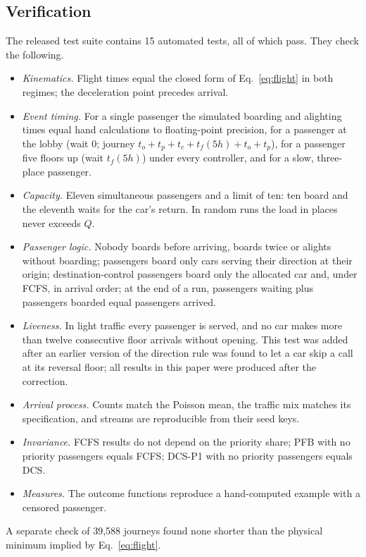 \documentclass[12pt,a4paper]{article}
\begin{document}
\subsection{Verification}
The released test suite contains 15 automated tests, all of which pass. They check the following.
\begin{itemize}[itemsep=1pt]
\item \emph{Kinematics.} Flight times equal the closed form of Eq.~\eqref{eq:flight} in both regimes; the deceleration point precedes arrival.
\item \emph{Event timing.} For a single passenger the simulated boarding and alighting times equal hand calculations to floating-point precision, for a passenger at the lobby (wait 0; journey $t_o+t_p+t_c+t_f(5h)+t_o+t_p$), for a passenger five floors up (wait $t_f(5h)$) under every controller, and for a slow, three-place passenger.
\item \emph{Capacity.} Eleven simultaneous passengers and a limit of ten: ten board and the eleventh waits for the car's return. In random runs the load in places never exceeds $Q$.
\item \emph{Passenger logic.} Nobody boards before arriving, boards twice or alights without boarding; passengers board only cars serving their direction at their origin; destination-control passengers board only the allocated car and, under FCFS, in arrival order; at the end of a run, passengers waiting plus passengers boarded equal passengers arrived.
\item \emph{Liveness.} In light traffic every passenger is served, and no car makes more than twelve consecutive floor arrivals without opening. This test was added after an earlier version of the direction rule was found to let a car skip a call at its reversal floor; all results in this paper were produced after the correction.
\item \emph{Arrival process.} Counts match the Poisson mean, the traffic mix matches its specification, and streams are reproducible from their seed keys.
\item \emph{Invariance.} FCFS results do not depend on the priority share; PFB with no priority passengers equals FCFS; DCS-P1 with no priority passengers equals DCS.
\item \emph{Measures.} The outcome functions reproduce a hand-computed example with a censored passenger.
\end{itemize}
A separate check of 39,588 journeys found none shorter than the physical minimum implied by Eq.~\eqref{eq:flight}.
\end{document}
